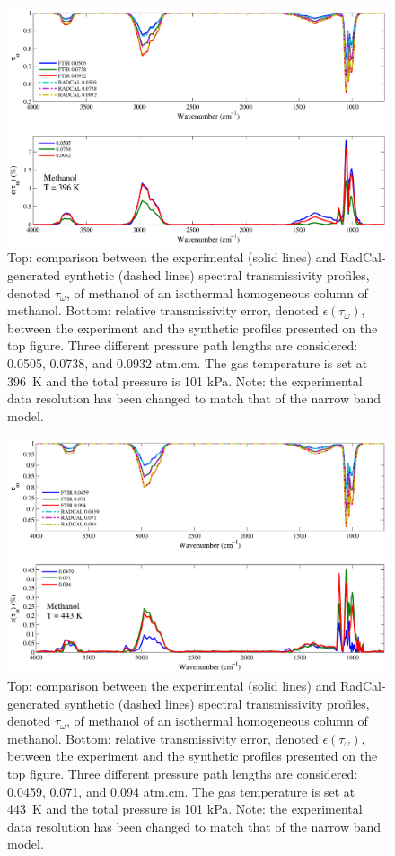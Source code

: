 \begin{figure}[p]
\includegraphics[width=\textwidth]{../Verification/Results_Test2/Methanol_396.pdf}
\caption{Top: comparison between the experimental (solid lines) and RadCal-generated synthetic (dashed lines) spectral transmissivity profiles, denoted $\tau_{\omega}$, of methanol of an isothermal homogeneous column of methanol. Bottom: relative transmissivity error, denoted $\epsilon{(\tau_{\omega})}$, between the experiment and the synthetic profiles presented on the top figure. Three different pressure path lengths are considered: 0.0505, 0.0738, and 0.0932 atm.cm. The gas temperature is set at 396~K and the total pressure is 101 kPa. Note: the experimental data resolution has been changed to match that of the narrow band model. \label{fig:methanol_Verify_396K}}
\end{figure}

\begin{figure}[p]
\includegraphics[width=\textwidth]{../Verification/Results_Test2/Methanol_443.pdf}
\caption{Top: comparison between the experimental (solid lines) and RadCal-generated synthetic (dashed lines) spectral transmissivity profiles, denoted $\tau_{\omega}$, of methanol of an isothermal homogeneous column of methanol. Bottom: relative transmissivity error, denoted $\epsilon{(\tau_{\omega})}$, between the experiment and the synthetic profiles presented on the top figure. Three different pressure path lengths are considered: 0.0459, 0.071, and 0.094 atm.cm. The gas temperature is set at 443~K and the total pressure is 101 kPa. Note: the experimental data resolution has been changed to match that of the narrow band model. \label{fig:methanol_Verify_443K}}
\end{figure}

